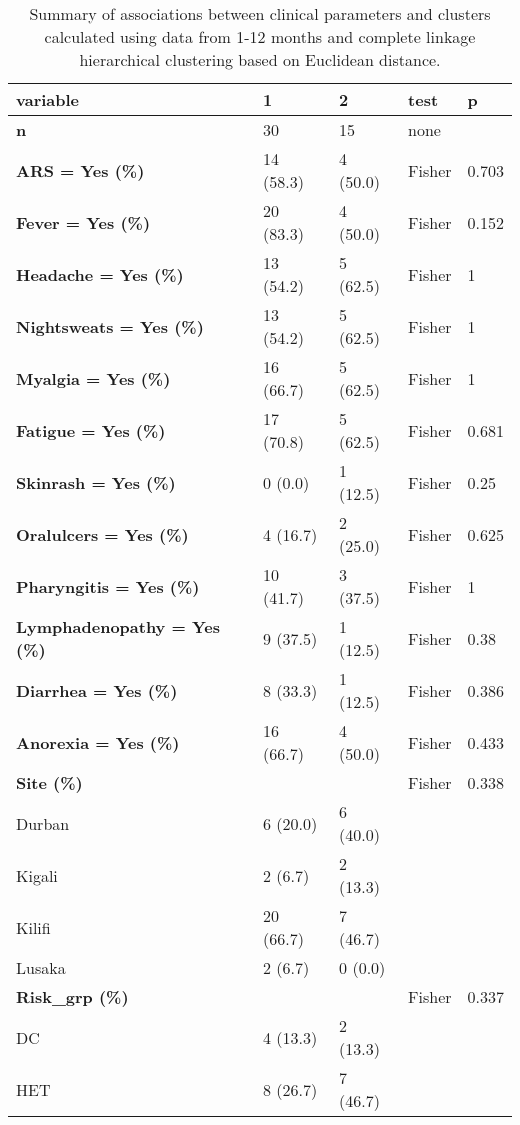 \documentclass[
]{article}
\begin{document}
\begin{table}

\caption{\label{tab:clusters112eu}Summary of associations between clinical parameters and clusters calculated using data from 1-12 months and complete linkage hierarchical clustering based on Euclidean distance.}
\centering
\begin{tabular}[t]{l|l|l|l|l}
\hline
variable & 1 & 2 & test & p\\
\hline
\textbf{n} & 30 & 15 & none & \\
\hline
\textbf{ARS = Yes (\%)} & 14 (58.3) & 4 (50.0) & Fisher & 0.703\\
\hline
\textbf{Fever = Yes (\%)} & 20 (83.3) & 4 (50.0) & Fisher & 0.152\\
\hline
\textbf{Headache = Yes (\%)} & 13 (54.2) & 5 (62.5) & Fisher & 1\\
\hline
\textbf{Nightsweats = Yes (\%)} & 13 (54.2) & 5 (62.5) & Fisher & 1\\
\hline
\textbf{Myalgia = Yes (\%)} & 16 (66.7) & 5 (62.5) & Fisher & 1\\
\hline
\textbf{Fatigue = Yes (\%)} & 17 (70.8) & 5 (62.5) & Fisher & 0.681\\
\hline
\textbf{Skinrash = Yes (\%)} & 0 (0.0) & 1 (12.5) & Fisher & 0.25\\
\hline
\textbf{Oralulcers = Yes (\%)} & 4 (16.7) & 2 (25.0) & Fisher & 0.625\\
\hline
\textbf{Pharyngitis = Yes (\%)} & 10 (41.7) & 3 (37.5) & Fisher & 1\\
\hline
\textbf{Lymphadenopathy = Yes (\%)} & 9 (37.5) & 1 (12.5) & Fisher & 0.38\\
\hline
\textbf{Diarrhea = Yes (\%)} & 8 (33.3) & 1 (12.5) & Fisher & 0.386\\
\hline
\textbf{Anorexia = Yes (\%)} & 16 (66.7) & 4 (50.0) & Fisher & 0.433\\
\hline
\textbf{Site (\%)} &  &  & Fisher & 0.338\\
\hline
Durban & 6 (20.0) & 6 (40.0) &  & \\
\hline
Kigali & 2 (6.7) & 2 (13.3) &  & \\
\hline
Kilifi & 20 (66.7) & 7 (46.7) &  & \\
\hline
Lusaka & 2 (6.7) & 0 (0.0) &  & \\
\hline
\textbf{Risk\_grp (\%)} &  &  & Fisher & 0.337\\
\hline
DC & 4 (13.3) & 2 (13.3) &  & \\
\hline
HET & 8 (26.7) & 7 (46.7) &  & \\

\end{tabular}
\end{table}
\end{document}
